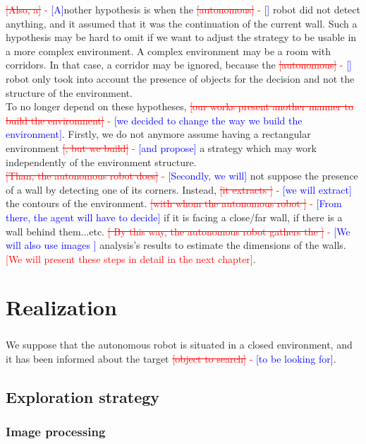 \documentclass[12pt]{report}
\newcommand{\hcr}[2]{\textcolor{red}{\sout{[#1]} - \textcolor{blue}{ [#2]}}}
\newcommand{\hc}[1]{\textcolor{red}{[#1]}}
\begin{document}
	\hcr{Also, a}{A}nother hypothesis is when the \hcr{autonomous}{} robot did not detect anything, and it assumed 
that it was the continuation of the current wall. Such a hypothesis may be hard to omit if we want to adjust the 
strategy to be usable in a more complex environment. A complex environment may be a room with corridors. In that case, a 
corridor may be ignored, because the \hcr{autonomous}{} robot only took into account the presence of objects for the 
decision and not the structure of the environment.\\
	
	To no longer depend on these hypotheses, \hcr{our works 
present another manner to build the environment}{we decided to change the way we build the environment}. Firstly, we do 
not anymore assume having a rectangular environment \hcr{, but we build}{and propose}  a strategy which may work 
independently of the environment structure.\\
\hcr{Than, the autonomous robot does}{Secondly, we will} not suppose the 
presence of a wall by detecting one of its corners. Instead, \hcr{it extracts }{we will extract} the contours of the 
environment. \hcr{with whom the autonomous robot }{From there, the agent will have to decide} if it is facing a 
close/far wall, if there is a wall behind them...etc. \hcr{	By this way, the autonomous robot gathers the }{We will 
also use images } analysis's results to estimate the dimensions of the walls.\hc{We will present these steps in detail 
in the next chapter}.
	
    \chapter{Realization}
    \label{chap:realization}
    \paragraph{}
    We suppose that the autonomous robot is situated in a closed environment, and it has been informed about the target 
\hcr{object to search}{to be looking for}. 
	\section{Exploration strategy}
	 \subsection{Image processing}
\end{document}
